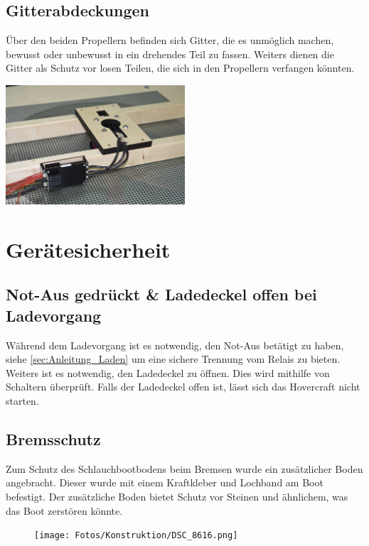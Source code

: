 \subsection{Gitterabdeckungen}
Über den beiden Propellern befinden sich Gitter, die es unmöglich machen, bewusst oder unbewusst in ein drehendes Teil zu fassen. 
Weiters dienen die Gitter als Schutz vor losen Teilen, die sich in den Propellern verfangen könnten. 

\begin{minipage}{13cm}
    \centering
    \includegraphics[width=0.5\textwidth]{Fotos/Gitter_unten.jpg}
\end{minipage}

\section{Gerätesicherheit}

\subsection{Not-Aus gedrückt \& Ladedeckel offen bei Ladevorgang}
Während dem Ladevorgang ist es notwendig, den Not-Aus betätigt zu haben, siehe \ref{sec:Anleitung_Laden} um eine sichere Trennung vom Relais zu bieten. \\
Weiters ist es notwendig, den Ladedeckel zu öffnen. Dies wird mithilfe von Schaltern überprüft. Falls der Ladedeckel offen ist, lässt sich das Hovercraft nicht starten.

\subsection{Bremsschutz}
Zum Schutz des Schlauchbootbodens beim Bremsen wurde ein zusätzlicher Boden angebracht. Dieser wurde mit einem Kraftkleber und Lochband am Boot befestigt. 
Der zusätzliche Boden bietet Schutz vor Steinen und ähnlichem, was das Boot zerstören könnte. 

\begin{figure}[h]
    \centering
    \texttt{[image: Fotos/Konstruktion/DSC\_8616.png]}
\end{figure}


